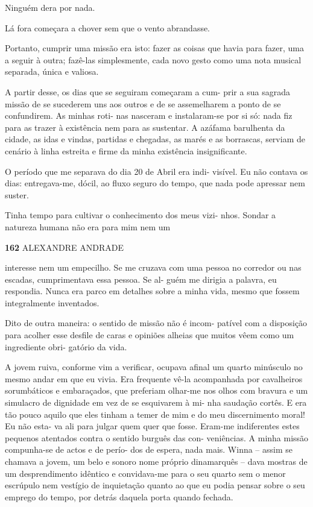 Ninguém dera por nada.

Lá fora começara a chover sem que o vento abrandasse.

Portanto, cumprir uma missão era isto: fazer as coisas que havia para
fazer, uma a seguir à outra; fazê-las simplesmente, cada novo gesto como
uma nota musical separada, única e valiosa.

A partir desse, os dias que se seguiram começaram a cum- prir a sua
sagrada missão de se sucederem uns aos outros e de se assemelharem a
ponto de se confundirem. As minhas roti- nas nasceram e instalaram-se
por si só: nada fiz para as trazer à existência nem para as sustentar. A
azáfama barulhenta da cidade, as idas e vindas, partidas e chegadas, as
marés e as borrascas, serviam de cenário à linha estreita e firme da
minha existência insignificante.

O período que me separava do dia 20 de Abril era indi- visível. Eu não
contava os dias: entregava-me, dócil, ao fluxo seguro do tempo, que nada
pode apressar nem suster.

Tinha tempo para cultivar o conhecimento dos meus vizi- nhos. Sondar a
natureza humana não era para mim nem um

\textbf{162 }ALEXANDRE ANDRADE

interesse nem um empecilho. Se me cruzava com uma pessoa no corredor ou
nas escadas, cumprimentava essa pessoa. Se al- guém me dirigia a
palavra, eu respondia. Nunca era parco em detalhes sobre a minha vida,
mesmo que fossem integralmente inventados.

Dito de outra maneira: o sentido de missão não é incom- patível com a
disposição para acolher esse desfile de caras e opiniões alheias que
muitos vêem como um ingrediente obri- gatório da vida.

A jovem ruiva, conforme vim a verificar, ocupava afinal um quarto
minúsculo no mesmo andar em que eu vivia. Era frequente vê-la
acompanhada por cavalheiros sorumbáticos e embaraçados, que preferiam
olhar-me nos olhos com bravura e um simulacro de dignidade em vez de se
esquivarem à mi- nha saudação cortês. E era tão pouco aquilo que eles
tinham a temer de mim e do meu discernimento moral! Eu não esta- va ali
para julgar quem quer que fosse. Eram-me indiferentes estes pequenos
atentados contra o sentido burguês das con- veniências. A minha missão
compunha-se de actos e de perío- dos de espera, nada mais. Winna --
assim se chamava a jovem, um belo e sonoro nome próprio dinamarquês --
dava mostras de um desprendimento idêntico e convidava-me para o seu
quarto sem o menor escrúpulo nem vestígio de inquietação quanto ao que
eu podia pensar sobre o seu emprego do tempo, por detrás daquela porta
quando fechada.

